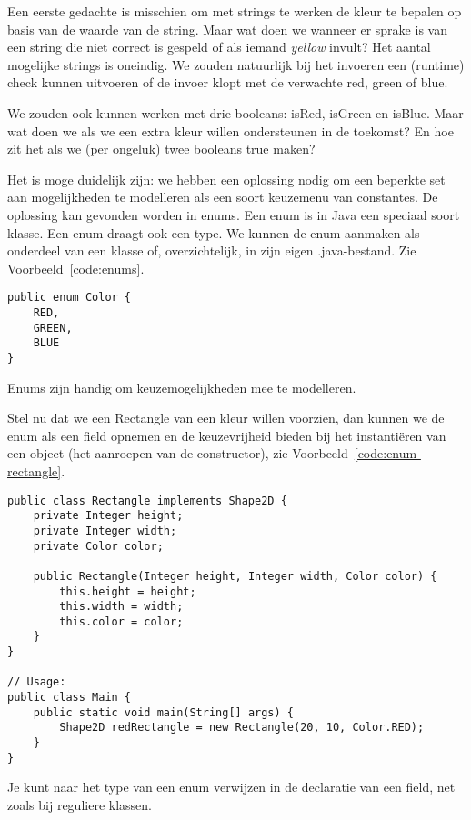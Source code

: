 \documentclass[dutch,a4paper,12pt,doubleside]{book}
\begin{document}
Een eerste gedachte is misschien om met strings te werken de kleur te bepalen 
op basis van de waarde van de string. Maar wat doen we wanneer er sprake is van een
string die niet correct is gespeld of als iemand \textit{yellow} invult?
Het aantal mogelijke strings is oneindig. We zouden natuurlijk bij het invoeren 
een (runtime) check kunnen uitvoeren of de invoer klopt met de verwachte red, green of blue.

We zouden ook kunnen werken met drie booleans: isRed, isGreen en isBlue. 
Maar wat doen we als we een extra kleur willen ondersteunen in de toekomst?
En hoe zit het als we (per ongeluk) twee booleans true maken?

Het is moge duidelijk zijn: we hebben een oplossing nodig om een beperkte set
aan mogelijkheden te modelleren als een soort keuzemenu van constantes. 
De oplossing kan gevonden worden in enums. Een enum is in Java een speciaal soort 
klasse. Een enum draagt ook een type. 
We kunnen de enum aanmaken als onderdeel van een klasse of, overzichtelijk, in zijn eigen .java-bestand.
Zie Voorbeeld~\ref{code:enums}.

\begin{listing}[H]
\begin{verbatim}
public enum Color {
    RED,
    GREEN,
    BLUE
}
\end{verbatim}
\caption{Enums zijn handig om keuzemogelijkheden mee te modelleren.}
\label{code:enums}
\end{listing}

Stel nu dat we een Rectangle van een kleur willen voorzien, dan kunnen we 
de enum als een field opnemen en de keuzevrijheid bieden bij het instantiëren
van een object (het aanroepen van de constructor), zie Voorbeeld~\ref{code:enum-rectangle}.

\begin{listing}[H]
\begin{verbatim}
public class Rectangle implements Shape2D {
    private Integer height;
    private Integer width;
    private Color color;

    public Rectangle(Integer height, Integer width, Color color) {
        this.height = height;
        this.width = width;
        this.color = color;
    }
}

// Usage:
public class Main {
    public static void main(String[] args) {
        Shape2D redRectangle = new Rectangle(20, 10, Color.RED);
    }
}

\end{verbatim}
\caption{Je kunt naar het type van een enum verwijzen in de declaratie van een field, net zoals bij reguliere klassen.}
\label{code:enum-rectangle}
\end{listing}
\end{document}
